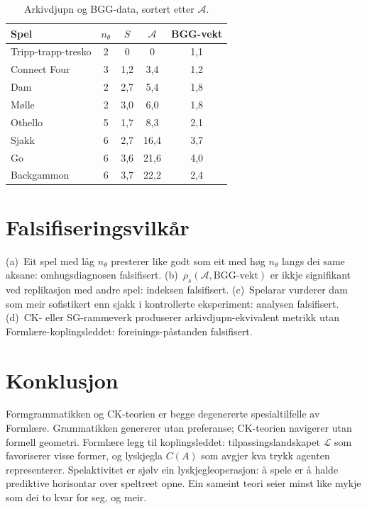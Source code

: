 \documentclass[10pt,twocolumn]{article}
\begin{document}
\begin{table}[h]
\centering\small
\caption{Arkivdjupn og BGG-data, sortert etter $\mathcal{A}$.}
\label{tab:results}
\begin{tabular}{@{}lcccc@{}}
\toprule
Spel & $n_\theta$ & $S$ & $\mathcal{A}$ & BGG-vekt \\
\midrule
Tripp-trapp-tresko & 2 & 0 & 0 & 1,1 \\
Connect Four & 3 & 1,2 & 3,4 & 1,2 \\
Dam & 2 & 2,7 & 5,4 & 1,8 \\
M\o lle & 2 & 3,0 & 6,0 & 1,8 \\
Othello & 5 & 1,7 & 8,3 & 2,1 \\
Sjakk & 6 & 2,7 & 16,4 & 3,7 \\
Go & 6 & 3,6 & 21,6 & 4,0 \\
Backgammon & 6 & 3,7 & 22,2 & 2,4 \\
\bottomrule
\end{tabular}
\end{table}


\section{Falsifiseringsvilk\aa r}

(a)~Eit spel med l\aa g $n_\theta$ presterer like godt som eit med h\o g $n_\theta$ langs dei same aksane: omhugsdiagnosen falsifisert. (b)~$\rho_s(\mathcal{A}, \text{BGG-vekt})$ er ikkje signifikant ved replikasjon med andre spel: indeksen falsifisert. (c)~Spelarar vurderer dam som meir sofistikert enn sjakk i kontrollerte eksperiment: analysen falsifisert. (d)~CK- eller SG-rammeverk produserer arkivdjupn-ekvivalent metrikk utan Forml\ae re-koplingsleddet: foreinings-p\aa standen falsifisert.


\section{Konklusjon}

Formgrammatikken og CK-teorien er begge degenererte spesialtilfelle av Forml\ae re. Grammatikken genererer utan preferanse; CK-teorien navigerer utan formell geometri. Forml\ae re legg til koplingsleddet: tilpassingslandskapet $\mathcal{L}$ som favoriserer visse former, og lyskjegla $C(A)$ som avgjer kva trykk agenten representerer. Spelaktivitet er sj\o lv ein lyskjegleoperasjon: \aa{} spele er \aa{} halde prediktive horisontar over speltreet opne. Ein sameint teori seier minst like mykje som dei to kvar for seg, og meir.
\end{document}
